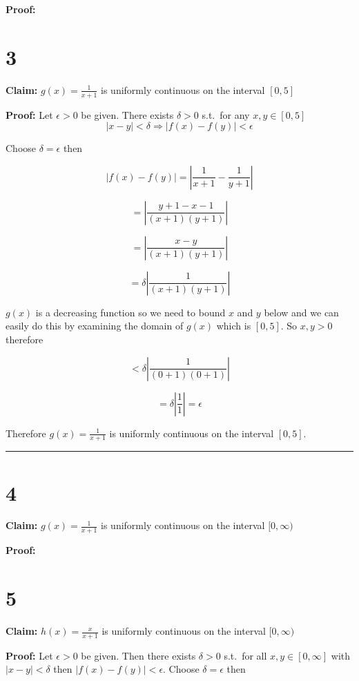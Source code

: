 \documentclass[10pt,letterpaper]{article}
\newcommand\qedsym{\hfill \rule{2mm}{2mm}}
\begin{document}
\textbf{Proof:}

\section*{3}

\textbf{Claim:} $g(x) = \frac{1}{x+1}$ is uniformly continuous on the interval $[0,5]$

\medskip

\textbf{Proof:} Let $\epsilon > 0$ be given. There exists $\delta > 0$ s.t.\ for any $x, y \in [0,5]$ \[|x-y| < \delta \Rightarrow |f(x) - f(y)| < \epsilon\]

Choose $\delta = \epsilon$ then

\[|f(x) - f(y)| = \left|\frac{1}{x+1} - \frac{1}{y+1}\right|\]

\[ = \left|\frac{y+1-x-1}{(x+1)(y+1)}\right|\]

\[ = \left|\frac{x-y}{(x+1)(y+1)}\right|\]

\[ = \delta\left|\frac{1}{(x+1)(y+1)}\right|\]

$g(x)$ is a decreasing function so we need to bound $x$ and $y$ below and we can easily do this by examining the domain of $g(x)$ which is $[0,5]$. So $x,y > 0$ therefore

\[ < \delta\left|\frac{1}{(0+1)(0+1)}\right|\]

\[ = \delta\left|\frac{1}{1}\right| = \epsilon\]

Therefore $g(x) = \frac{1}{x+1}$ is uniformly continuous on the interval $[0,5]$.

\qedsym

\section*{4}

\textbf{Claim:} $g(x) = \frac{1}{x+1}$ is uniformly continuous on the interval $[0,\infty)$

\medskip

\textbf{Proof:}

\section*{5}

\textbf{Claim:} $h(x) = \frac{x}{x+1}$ is uniformly continuous on the interval $[0, \infty)$

\medskip

\textbf{Proof:} Let $\epsilon > 0$ be given. Then there exists $\delta > 0$ s.t.\ for all $x,y\in[0,\infty]$ with $|x-y|<\delta$ then $|f(x)-f(y)| < \epsilon$. Choose $\delta = \epsilon$ then
\end{document}
